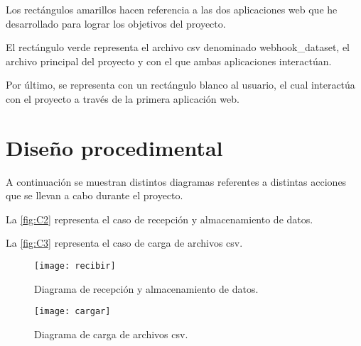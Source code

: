 Los rectángulos amarillos hacen referencia a las dos aplicaciones web que he desarrollado para lograr los objetivos del proyecto.

El rectángulo verde representa el archivo csv denominado webhook\_dataset, el archivo principal del proyecto y con el que ambas aplicaciones interactúan.

Por último, se representa con un rectángulo blanco al usuario, el cual interactúa con el proyecto a través de la primera aplicación web.

\section{Diseño procedimental}
A continuación se muestran distintos diagramas referentes a distintas acciones que se llevan a cabo durante el proyecto.

La \autoref{fig:C2} representa el caso de recepción y almacenamiento de datos.

La \autoref{fig:C3} representa el caso de carga de archivos csv.

\begin{figure}
    \centering
    \texttt{[image: recibir]} 
    \caption{Diagrama de recepción y almacenamiento de datos.}
    \label{fig:C2}
\end{figure}


\begin{figure}
    \centering
    \texttt{[image: cargar]} 
    \caption{Diagrama de carga de archivos csv.}
    \label{fig:C3}
\end{figure}